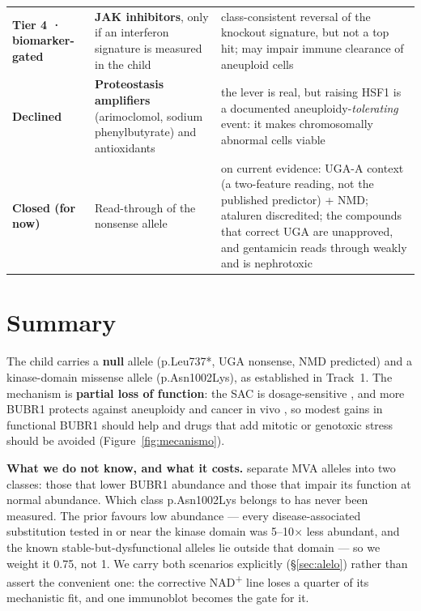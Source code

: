 \documentclass[10pt]{article}
\begin{document}
\begin{keybox}[title={Recommendations at a glance}]
\begin{tabularx}{\linewidth}{@{}P{2.55cm}P{5.1cm}L@{}}
\textbf{Tier 4 · biomarker-gated} & \textbf{JAK inhibitors}, only if an interferon signature is measured in the child & class-consistent reversal of the knockout signature, but not a top hit; may impair immune clearance of aneuploid cells\\
\textbf{Declined} & \textbf{Proteostasis amplifiers} (arimoclomol, sodium phenylbutyrate) and antioxidants & the lever is real, but raising HSF1 is a documented aneuploidy-\emph{tolerating} event: it makes chromosomally abnormal cells viable\\
\textbf{Closed (for now)} & Read-through of the nonsense allele & on current evidence: UGA-A context (a two-feature reading, not the published predictor) + NMD; ataluren discredited; the compounds that correct UGA are unapproved, and gentamicin reads through weakly and is nephrotoxic
\end{tabularx}
\end{keybox}

\noindent{}\hfill
{}\hfill
{}\hfill
{}

\section{Summary}

The child carries a \textbf{null}  allele (p.Leu737*, UGA nonsense, NMD predicted) and a
kinase-domain missense allele (p.Asn1002Lys), as established in Track~1. The mechanism is \textbf{partial loss of
function}: the SAC is dosage-sensitive \citep{bohers}, and more BUBR1 protects against aneuploidy and cancer in
vivo \citep{baker13}, so modest gains in functional BUBR1 should help and drugs that add mitotic or genotoxic
stress should be avoided (Figure~\ref{fig:mecanismo}).

\textbf{What we do not know, and what it costs.} \citet{suij} separate MVA alleles into two classes: those that
lower BUBR1 abundance and those that impair its function at normal abundance. Which class p.Asn1002Lys belongs to
has never been measured. The prior favours low abundance --- every disease-associated substitution tested in
or near the kinase domain was 5--10$\times$ less abundant, and the known stable-but-dysfunctional alleles lie outside that domain --- so
we weight it 0.75, not 1. We carry both scenarios explicitly (§\ref{sec:alelo}) rather than assert the convenient
one: the corrective NAD\textsuperscript{+} line loses a quarter of its mechanistic fit, and one immunoblot becomes
the gate for it.
\end{document}
